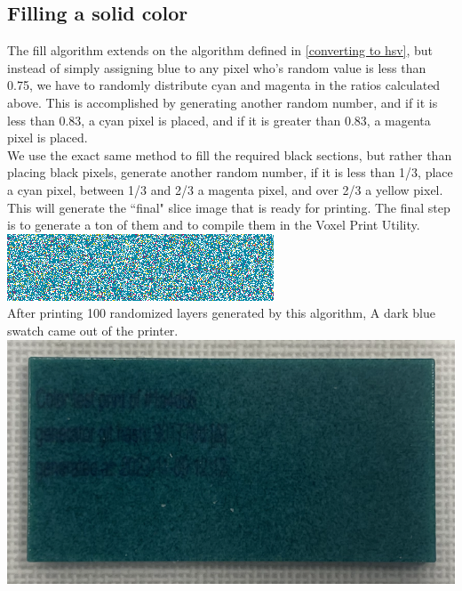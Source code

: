 \documentclass{article}
\begin{document}
\begin{multicols}{2}
\subsection{Filling a solid color}

\noindent
The fill algorithm extends on the algorithm defined in \ref{converting to hsv}, but instead of simply assigning blue to any pixel who's random value is less than 0.75, we have to randomly distribute cyan and magenta in the ratios calculated above. This is accomplished by generating another random number, and if it is less than 0.83, a cyan pixel is placed, and if it is greater than 0.83, a magenta pixel is placed. 
\\

\noindent
We use the exact same method to fill the required black sections, but rather than placing black pixels, generate another random number, if it is less than 1/3, place a cyan pixel, between 1/3 and 2/3 a magenta pixel, and over 2/3 a yellow pixel. This will generate the ``final" slice image that is ready for printing. The final step is to generate a ton of them and to compile them in the Voxel Print Utility.
\\

\noindent
\includegraphics[width=\columnwidth]{objective-color-hsv}
\\

\noindent
After printing 100 randomized layers generated by this algorithm, A dark blue swatch came out of the printer.
\\

\noindent
\includegraphics[width=\columnwidth]{ffa4d66-result-1}
\\


\end{multicols}
\end{document}
